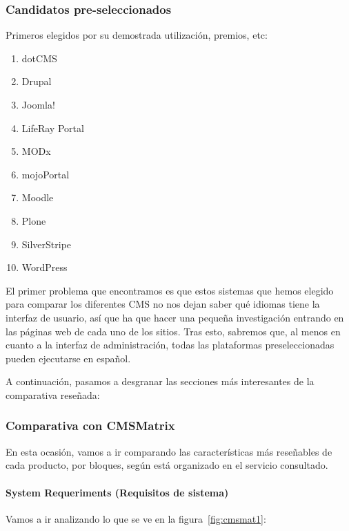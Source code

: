 \subsubsection{Candidatos pre-seleccionados}
\par Primeros elegidos por su demostrada utilización, premios, etc:

\begin{enumerate}
\item dotCMS
\item Drupal
\item Joomla!
\item LifeRay Portal
\item MODx
\item mojoPortal
\item Moodle
\item Plone
\item SilverStripe
\item WordPress
\end{enumerate}

\par El primer problema que encontramos es que estos sistemas que hemos elegido para comparar los diferentes CMS no nos dejan saber qué idiomas tiene la interfaz de usuario, así que ha que hacer una pequeña investigación entrando en las páginas web de cada uno de los sitios. Tras esto, sabremos que, al menos en cuanto a la interfaz de administración, todas las plataformas preseleccionadas pueden ejecutarse en español.


\par A continuación, pasamos a desgranar las secciones más interesantes de la comparativa reseñada:

\subsubsection{Comparativa con CMSMatrix}

\par En esta ocasión, vamos a ir comparando las características más reseñables de cada producto, por bloques, según está organizado en el servicio consultado.

\paragraph{System Requeriments (Requisitos de sistema)}

\par Vamos a ir analizando lo que se ve en la figura~\ref{fig:cmsmat1}:

